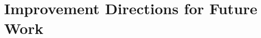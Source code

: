 \documentclass[11pt,a4paper]{article}
\begin{document}


\section{Improvement Directions for Future Work} \label{sec:discussion}%


\end{document}
